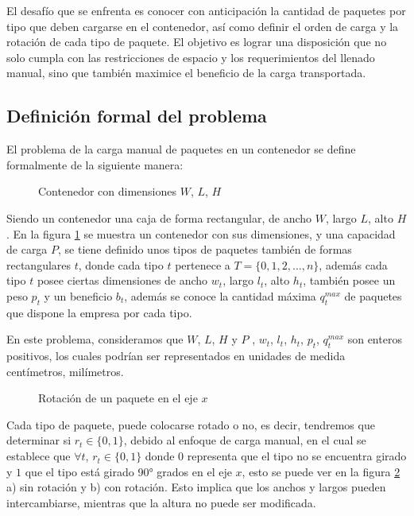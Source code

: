 \documentclass[openany]{article}
\begin{document}
El desafío que se enfrenta es conocer con anticipación la cantidad de paquetes por tipo que deben cargarse en el contenedor, así como definir el orden de carga y la rotación de cada tipo de paquete. El objetivo es lograr una disposición que no solo cumpla con las restricciones de espacio y los requerimientos del llenado manual, sino que también maximice el beneficio de la carga transportada.

\subsection{Definición formal del problema}

El problema de la carga manual de paquetes en un contenedor se define formalmente de la siguiente manera:

\begin{figure}[H]
    \centering
    
    \caption{Contenedor con dimensiones $W$, $L$, $H$}
    \label{fig:container}
\end{figure}

Siendo un contenedor una caja de forma rectangular, de ancho $W$, largo $L$, alto $H$. En la figura \ref{fig:container} se muestra un contenedor con sus dimensiones, y una capacidad de carga $P$, se tiene definido unos tipos de paquetes también de formas rectangulares $t$, donde cada tipo $t$ pertenece a $T = \{0, 1, 2, \ldots, n\}$, además cada tipo $t$ posee ciertas dimensiones de ancho $w_t$, largo $l_t$, alto $h_t$, también posee un peso $p_t$ y un beneficio $b_t$, además se conoce la cantidad máxima $q^{max}_t$ de paquetes que dispone la empresa por cada tipo.

En este problema, consideramos que $W$, $L$, $H$ y $P$ , $w_t$, $l_t$, $h_t$, $p_t$, $q^{max}_t$ son enteros positivos, los cuales podrían ser representados en unidades de medida centímetros, milímetros.

\begin{figure}[H]
    \centering
    
    \caption{Rotación de un paquete en el eje $x$}
    \label{fig:rotation}
\end{figure}

Cada tipo de paquete, puede colocarse rotado o no, es decir, tendremos que determinar si $r_t \in \{0, 1\}$, debido al enfoque de carga manual, en el cual se establece que $\forall t$, $r_t \in \{0, 1\}$ donde $0$ representa que el tipo no se encuentra girado y $1$ que el tipo está girado 90° grados en el eje $x$, esto se puede ver en la figura \ref{fig:rotation} a) sin rotación y b) con rotación. Esto implica que los anchos y largos pueden intercambiarse, mientras que la altura no puede ser modificada.
\end{document}
